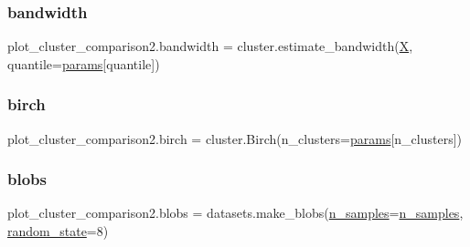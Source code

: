 \subsubsection{\texorpdfstring{bandwidth}{bandwidth}}
{\footnotesize\ttfamily plot\+\_\+cluster\+\_\+comparison2.\+bandwidth = cluster.\+estimate\+\_\+bandwidth(\hyperlink{namespaceplot__cluster__comparison2_a8e252c334e74232a95e8cd3f77445dc4}{X}, quantile=\hyperlink{namespaceplot__cluster__comparison2_a2c45c06ff9f589e117a4d45eca4dd71d}{params}\mbox{[}\textquotesingle{}quantile\textquotesingle{}\mbox{]})}

\mbox{\label{namespaceplot__cluster__comparison2_a94e74311f72a15262b0dcd321635ad44}} 
\subsubsection{\texorpdfstring{birch}{birch}}
{\footnotesize\ttfamily plot\+\_\+cluster\+\_\+comparison2.\+birch = cluster.\+Birch(n\+\_\+clusters=\hyperlink{namespaceplot__cluster__comparison2_a2c45c06ff9f589e117a4d45eca4dd71d}{params}\mbox{[}\textquotesingle{}n\+\_\+clusters\textquotesingle{}\mbox{]})}

\mbox{\label{namespaceplot__cluster__comparison2_a48f2da74d3a038459d84fae4373c9c21}} 
\subsubsection{\texorpdfstring{blobs}{blobs}}
{\footnotesize\ttfamily plot\+\_\+cluster\+\_\+comparison2.\+blobs = datasets.\+make\+\_\+blobs(\hyperlink{namespaceplot__cluster__comparison2_ab79e3292af180973ba0da8e7c55b6d76}{n\+\_\+samples}=\hyperlink{namespaceplot__cluster__comparison2_ab79e3292af180973ba0da8e7c55b6d76}{n\+\_\+samples}, \hyperlink{namespaceplot__cluster__comparison2_a58de884130398415c315dc68b9c744ca}{random\+\_\+state}=8)}

\mbox{\label{namespaceplot__cluster__comparison2_ae8335db7df87091b4988a6bfbb3c4c1f}} 
